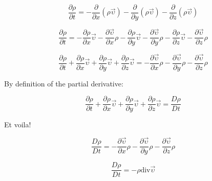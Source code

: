 \documentclass[12pt]{report}
\begin{document}
\begin{equation}
\frac{\partial \rho}{\partial t} = - \frac{\partial}{\partial x} (\rho \vec{\upsilon}) - \frac{\partial}{\partial y} (\rho \vec{\upsilon}) - \frac{\partial}{\partial z} (\rho \vec{\upsilon})
\end{equation}

\begin{equation}
\frac{\partial \rho}{\partial t} = - \frac{\partial \rho}{\partial x} \vec{\upsilon} - \frac{\partial \vec{\upsilon}}{\partial x} \rho - \frac{\partial \rho}{\partial y} \vec{\upsilon} - \frac{\partial \vec{\upsilon}}{\partial y} \rho - \frac{\partial \rho}{\partial z} \vec{\upsilon} - \frac{\partial \vec{\upsilon}}{\partial z} \rho 
\end{equation}

\begin{equation}
\frac{\partial \rho}{\partial t} + \frac{\partial \rho}{\partial x} \vec{\upsilon} + \frac{\partial \rho}{\partial y} \vec{\upsilon} + \frac{\partial \rho}{\partial z} \vec{\upsilon} =  - \frac{\partial \vec{\upsilon}}{\partial x} \rho - \frac{\partial \vec{\upsilon}}{\partial y} \rho - \frac{\partial \vec{\upsilon}}{\partial z} \rho
\end{equation}

By definition of the partial derivative:

\begin{equation}
\frac{\partial \rho}{\partial t} + \frac{\partial \rho}{\partial x} \vec{\upsilon} + \frac{\partial \rho}{\partial y} \vec{\upsilon} + \frac{\partial \rho}{\partial z} \vec{\upsilon} = \frac{D \rho}{D t}
\end{equation}

Et voila!

\begin{equation}
\frac{D \rho}{D t} = - \frac{\partial \vec{\upsilon}}{\partial x} \rho - \frac{\partial \vec{\upsilon}}{\partial y} \rho - \frac{\partial \vec{\upsilon}}{\partial z} \rho
\end{equation}


\begin{equation}
\frac{D \rho}{D t} = - \rho \text{div} \vec{\upsilon}
\end{equation}











\newpage

\begin{thebibliography}{50}



\end{thebibliography}
\end{document}
